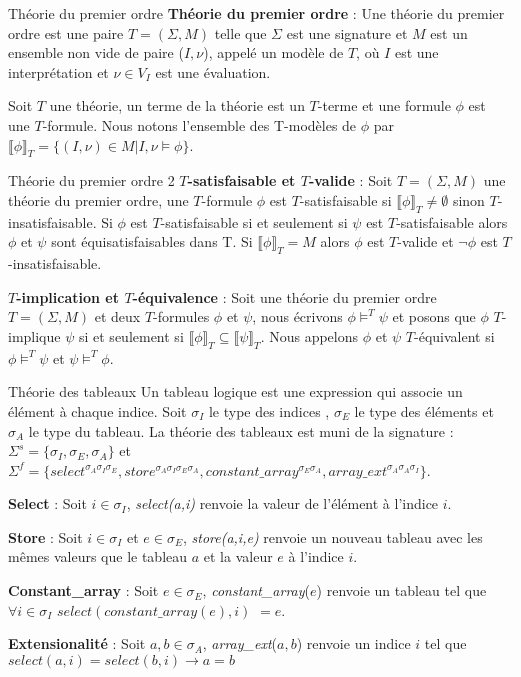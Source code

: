 \documentclass[9pt]{beamer}
\newcommand\phibra{\llbracket\phi\rrbracket}
\newcommand\psibra{\llbracket\psi\rrbracket}
\begin{document}
\begin{frame}{Th\'eorie du premier ordre}
\textbf{Th\'eorie du premier ordre} : Une th\'eorie du premier ordre est une paire $T=( \Sigma,M)$ telle que $ \Sigma$ est une signature et $M$ est un ensemble non vide de paire ($I,\nu$), appel\'e un mod\`ele de $T$, o\`u $I$ est une interpr\'etation et $\nu\in V_{I}$ est une \'evaluation.

Soit $T$ une th\'eorie, un terme de la th\'eorie est un $T$-terme et une formule $\phi$ est une $T$-formule. Nous notons l'ensemble des T-mod\`eles de $\phi$ par$\phibra_{T} = \{(I,\nu)\in M | I,\nu\models\phi\}$.
\end{frame}

\begin{frame}{Th\'eorie du premier ordre 2}
\textbf{$T$-satisfaisable et $T$-valide} : Soit $T = (\Sigma,M)$ une th\'eorie du premier ordre, une $T$-formule $\phi$ est $T$-satisfaisable si $\phibra_{T} \neq \emptyset$ sinon $T$-insatisfaisable. Si $\phi$ est $T$-satisfaisable si et seulement si $\psi$ est $T$-satisfaisable alors $\phi$ et $\psi$ sont \'equisatisfaisables dans T. Si $\phibra_{T} = M$ alors $\phi$ est $T$-valide et $\neg\phi$ est $T$-insatisfaisable.

\textbf{$T$-implication et $T$-\'equivalence} : Soit une th\'eorie du premier ordre $T = ( \Sigma,M)$ et deux $T$-formules $\phi$ et $\psi$, nous \'ecrivons $\phi\models^{T}\psi$ et posons que $\phi$ $T$-implique $\psi$ si et seulement si $\phibra_{T}\subseteq \psibra_{T}$. Nous appelons $\phi$  et $\psi$  $T$-\'equivalent si $\phi\models^{T}\psi$ et $\psi\models^{T}\phi$.
\end{frame}

\begin{frame}{Th\'eorie des tableaux}
	Un tableau logique est une expression qui associe un \'el\'ement \`a chaque indice. Soit $\sigma_I$ le type des indices , $\sigma_E$ le type des \'el\'ements et $\sigma_A$ le type du tableau.
	La th\'eorie des tableaux est muni de la signature : $\Sigma^s=\{\sigma_I,\sigma_E,\sigma_A\}$ et 
	$\Sigma^f=\{select^{\sigma_A\sigma_I\sigma_E},store^{\sigma_A\sigma_I\sigma_E\sigma_A},constant\_array^{\sigma_E\sigma_A},array\_ext^{\sigma_A\sigma_A\sigma_I}\}$.
	
	\textbf{Select} : Soit $i\in \sigma_I$, \textit{select(a,i)} renvoie la valeur de l'\'el\'ement \`a l'indice $i$.
	
	\textbf{Store} :  Soit $i\in \sigma_I$ et $e\in \sigma_E$, \textit{store(a,i,e)} renvoie un nouveau tableau avec les m\^emes valeurs que le tableau $a$ et la valeur $e$ \`a l'indice $i$.
	
	\textbf{Constant_array} : Soit $e\in \sigma_E$, \textit{constant\_array}($e$) renvoie un tableau tel que $\forall i\in \sigma_I$ $select(constant\_array(e),i)$ $= e$.
	
	\textbf{Extensionalit\'e} : Soit $a,b\in \sigma_A$, \textit{array_ext}($a,b$) renvoie un indice $i$ tel que $select(a,i) = select(b,i)\rightarrow a = b$
\end{frame}
\end{document}
